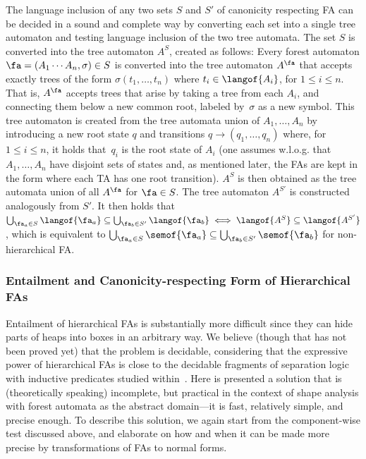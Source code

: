 The language inclusion of any two sets $S$ and $S'$ of canonicity respecting FA can be decided in a sound and complete way by converting each set into a single tree automaton and testing language inclusion of the two tree automata.
%
The set $S$ is converted into the tree automaton $A^S$, created as follows:
Every forest automaton $\fa = (A_1\cdots A_n,\sigma)\in S$ is converted into the tree automaton $A^\fa$ that accepts exactly trees of the form 
$\sigma(t_1,\ldots,t_n)$ where $t_i\in\langof{A_i}$, for $1\leq i\leq n$. 
That is, $A^\fa$ accepts trees that arise by taking a tree from each $A_i$, and connecting them below a new common root, labeled by~$\sigma$ as a new symbol.
This tree automaton is created from the tree automata union of $A_1,\ldots,A_n$
by introducing a new root state $q$ and transitions
$q\rightarrow(q_1,\ldots,q_n)$ where, for $1\leq i \leq n$, it holds that~$q_i$ is the root state of
$A_i$ (one assumes w.l.o.g. that $A_1, \ldots, A_n$ have disjoint sets of
states and, as mentioned later, the FAs are kept in the form where each TA has one root transition).
%
$A^S$ is then obtained as the tree automata union of all $A^\fa$ for $\fa\in S$. 
%
The tree automaton $A^{S'}$ is constructed analogously from $S'$.
It then holds that 
$\bigcup_{\fa_a\in S}\langof{\fa_a} \subseteq \bigcup_{\fa_{b}\in S'}\langof{\fa_{b}} \iff \langof{A^S}\subseteq\langof{A^{S'}}$, which is equivalent to $\bigcup_{\fa_a\in S}\semof{\fa_a} \subseteq \bigcup_{\fa_{b}\in S'}\semof{\fa_{b}}$ for non-hierarchical FA.


\subsubsection*{Entailment and Canonicity-respecting Form of Hierarchical FAs}\label{sec:label}
Entailment of hierarchical FAs is substantially more difficult since they can
hide parts of heaps into boxes in an arbitrary way.
%
We believe (though that has not been proved yet) that
the problem is decidable, considering that the expressive power of
hierarchical FAs is close to the decidable fragments of separation logic with
inductive predicates studied within~\cite{iosif_treewidth_2013,Katelaan:seplog}.
%
%
Here is presented a solution that is (theoretically speaking) incomplete, but
practical in the context of shape analysis with forest automata as the
abstract domain---it is fast, relatively simple, and
precise enough.
%
To describe this solution, we again start from the component-wise test discussed above, and
elaborate on how and when it can be made more precise by transformations of FAs
to normal forms.
%

